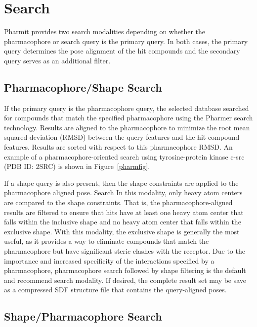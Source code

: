 \section{Search}

Pharmit provides two search modalities depending on whether the pharmacophore or search query is the primary query.  In both cases, the primary query determines the pose alignment of the hit compounds and the secondary query serves as an additional filter.

\subsection{Pharmacophore/Shape Search}

If the primary query is the pharmacophore query, the selected database searched for compounds that match the specified pharmacophore using the Pharmer \cite{Koes_2011} search technology.  Results are aligned to the pharmacophore to minimize the root mean squared deviation (RMSD) between the query features and the hit compound features. Results are sorted with respect to this pharmacophore RMSD. An example of a pharmacophore-oriented search using tyrosine-protein kinase c-src (PDB ID: 2SRC) is shown in Figure~\ref{pharmfig}.

If a shape query is also present, then the shape constraints are applied to the pharmacophore aligned pose. Search In this modality, only heavy atom centers are compared to the shape constraints.  That is, the pharmacophore-aligned results are filtered to ensure that hits have at least one heavy atom center that falls within the inclusive shape and no heavy atom center that falls within the exclusive shape.  With this modality, the exclusive shape is generally the most useful, as it provides a way to eliminate compounds that match the pharmacophore but have significant steric clashes with the receptor.
Due to the importance and increased specificity of the interactions specified by a pharmacophore, pharmacophore search followed by shape filtering is the default and recommend search modality.  If desired, the complete result set may be save as a compressed SDF structure file that contains the query-aligned poses.

\subsection{Shape/Pharmacophore Search}

